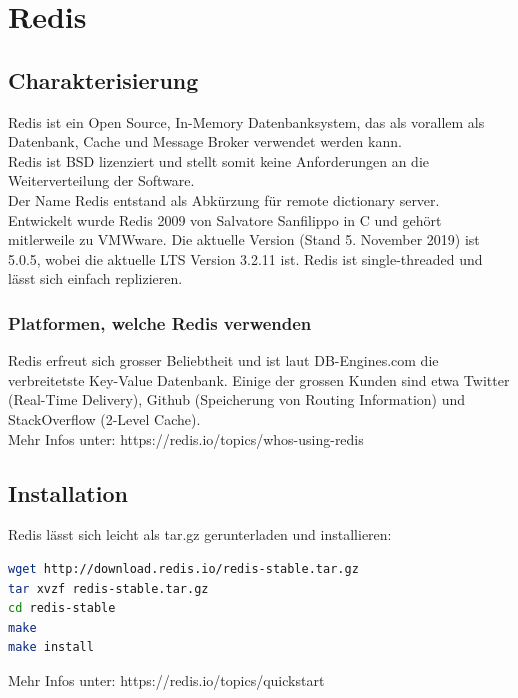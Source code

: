 \section{Redis}
\subsection{Charakterisierung}
Redis ist ein Open Source, In-Memory Datenbanksystem, das als vorallem als Datenbank, Cache und Message Broker verwendet werden kann.\\
Redis ist BSD lizenziert und stellt somit keine Anforderungen an die Weiterverteilung der Software.\\
Der Name Redis entstand als Abkürzung für remote dictionary server.\\
Entwickelt wurde Redis 2009 von Salvatore Sanfilippo in C und gehört mitlerweile zu VMWware. Die aktuelle Version (Stand 5. November 2019) ist 5.0.5, wobei die aktuelle LTS Version 3.2.11 ist.
Redis ist single-threaded und lässt sich einfach replizieren.

\subsubsection{Platformen, welche Redis verwenden}
Redis erfreut sich grosser Beliebtheit und ist laut DB-Engines.com die verbreitetste Key-Value Datenbank.
Einige der grossen Kunden sind etwa Twitter (Real-Time Delivery), Github (Speicherung von Routing Information) und StackOverflow (2-Level Cache).\\
Mehr Infos unter: https://redis.io/topics/whos-using-redis
\subsection{Installation}
Redis lässt sich leicht als tar.gz gerunterladen und installieren:
\begin{lstlisting}[language=bash]
wget http://download.redis.io/redis-stable.tar.gz
tar xvzf redis-stable.tar.gz
cd redis-stable
make
make install
\end{lstlisting}
Mehr Infos unter: https://redis.io/topics/quickstart
\clearpage
